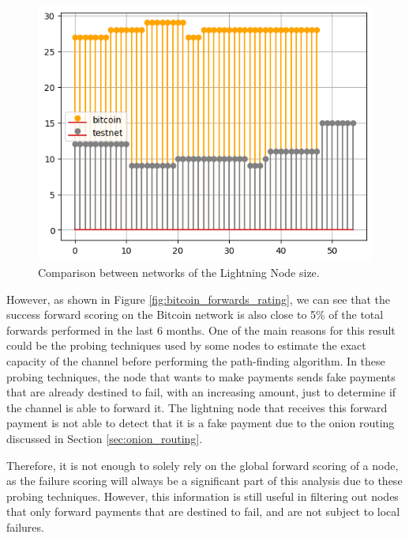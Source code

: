 \begin{figure}[H]
    \begin{center}
      \includegraphics[scale=0.7]{imgs/bitcoin_vs_testnet_channels_size.png}
    \end{center}
    \caption{Comparison between networks of the Lightning Node size.}
    \label{fig:bitcoin_vs_testnet_channels_size}
\end{figure}

However, as shown in Figure \ref{fig:bitcoin_forwards_rating}, we can see that the success
forward scoring on the Bitcoin network is also close to 5\% of the total forwards performed 
in the last 6 months. One of the main reasons for this result could be the probing techniques 
used by some nodes to estimate the exact capacity of the channel before performing the path-finding
algorithm. In these probing techniques, the node that wants to make payments sends fake payments
that are already destined to fail, with an increasing amount, just to determine if the channel 
is able to forward it. The lightning node that receives this forward payment is not able to 
detect that it is a fake payment due to the onion routing discussed in Section \ref{sec:onion_routing}.

Therefore, it is not enough to solely rely on the global forward scoring of a node, 
as the failure scoring will always be a significant part of this analysis due to these 
probing techniques. However, this information is still useful in filtering out nodes 
that only forward payments that are destined to fail, and are not subject to local failures.

